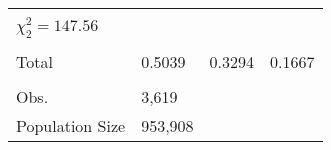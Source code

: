 \documentclass[11pt, oneside]{article}        %
\begin{document}
\begin{longtable}[h]
\begin{tabular}{llll}
                                       &          &            &            \\
$\chi^2_2 = 147.56$                    &          &            &            \\
                                       &          &            &            \\ \hline
Total                                  & 0.5039   & 0.3294     & 0.1667     \\
                                       &          &            &            \\
Obs.                                   & 3,619    &            &            \\
Population Size                        & 953,908  &            &      \\
 \hline     \hline
\end{tabular}
\end{longtable}
\end{document}
